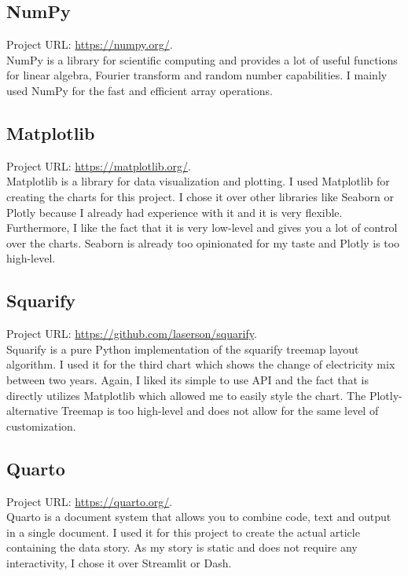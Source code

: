 \documentclass{article}
\begin{document}
\subsection{NumPy}
Project URL: \url{https://numpy.org/}.\\
NumPy is a library for scientific computing and provides a lot of useful functions for linear algebra, Fourier transform and random number capabilities.
I mainly used NumPy for the fast and efficient array operations.

\subsection{Matplotlib}
Project URL: \url{https://matplotlib.org/}.\\
Matplotlib is a library for data visualization and plotting.
I used Matplotlib for creating the charts for this project.
I chose it over other libraries like Seaborn or Plotly because I already had experience with it and it is very flexible.
Furthermore, I like the fact that it is very low-level and gives you a lot of control over the charts.
Seaborn is already too opinionated for my taste and Plotly is too high-level.

\subsection{Squarify}
Project URL: \url{https://github.com/laserson/squarify}.\\
Squarify is a pure Python implementation of the squarify treemap layout algorithm.
I used it for the third chart which shows the change of electricity mix between two years.
Again, I liked its simple to use API and the fact that is directly utilizes Matplotlib which allowed me to easily style the chart.
The Plotly-alternative Treemap is too high-level and does not allow for the same level of customization.

\subsection{Quarto}
Project URL: \url{https://quarto.org/}.\\
Quarto is a document system that allows you to combine code, text and output in a single document.
I used it for this project to create the actual article containing the data story.
As my story is static and does not require any interactivity, I chose it over Streamlit or Dash.

\newpage
\end{document}
